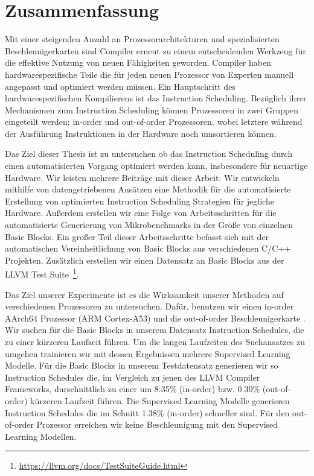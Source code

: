 \chapter*{Zusammenfassung}
Mit einer steigenden Anzahl an Prozessorarchitekturen und spezialisierten Beschleunigerkarten sind Compiler erneut zu einem entscheidenden Werkzeug für die effektive Nutzung von neuen Fähigkeiten geworden.
Compiler haben hardwarespezifische Teile die für jeden neuen Prozessor von Experten manuell angepasst und optimiert werden müssen.
Ein Hauptschritt des hardwarespezifischen Kompilierens ist das Instruction Scheduling.
Bezüglich ihrer Mechanismen zum Instruction Scheduling können Prozessoren in zwei Gruppen eingeteilt werden: in-order und out-of-order Prozessoren, wobei letztere während der Ausführung Instruktionen in der Hardware noch umsortieren können.

Das Ziel dieser Thesis ist zu untersuchen ob das Instruction Scheduling durch einen automatisierten Vorgang optimiert werden kann, insbesondere für neuartige Hardware.
Wir leisten mehrere Beiträge mit dieser Arbeit:
Wir entwickeln mithilfe von datengetriebenen Ansätzen eine Methodik für die automatisierte Erstellung von optimierten Instruction Scheduling Strategien für jegliche Hardware.
Außerdem erstellen wir eine Folge von Arbeitsschritten für die automatisierte Generierung von Mikrobenchmarks in der Größe von einzelnen Basic Blocks.
Ein großer Teil dieser Arbeitsschritte befasst sich mit der automatischen Vereinheitlichung von Basic Blocks aus verschiedenen C/C++ Projekten.
Zusätzlich erstellen wir einen Datensatz an Basic Blocks aus der LLVM Test Suite~\footnote[1]{\url{https://llvm.org/docs/TestSuiteGuide.html}}.

Das Ziel unserer Experimente ist es die Wirksamkeit unserer Methoden auf verschiedenen Prozessoren zu untersuchen.
Dafür, benutzen wir einen in-order AArch64 Prozessor (ARM Cortex-A53) und die out-of-order Beschleunigerkarte \auroralong{}.
Wir suchen für die Basic Blocks in unserem Datensatz Instruction Schedules, die zu einer kürzeren Laufzeit führen.
Um die langen Laufzeiten des Suchansatzes zu umgehen trainieren wir mit dessen Ergebnissen mehrere Supervised Learning Modelle.
Für die Basic Blocks in unserem Testdatensatz generieren wir so Instruction Schedules die, im Vergleich zu jenen des LLVM Compiler Frameworks, durschnittlich zu einer um 8.35\% (in-order) bzw. 0.30\% (out-of-order) kürzeren Laufzeit führen.
Die Supervised Learning Modelle generieren Instruction Schedules die im Schnitt 1.38\% (in-order) schneller sind.
Für den out-of-order Prozessor erreichen wir keine Beschleunigung mit den Supervised Learning Modellen.
